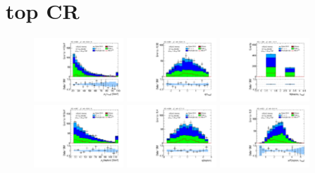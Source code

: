 \clearpage

\section{top CR}

\begin{figure}[!htpb]
  \centering
  \includegraphics[width=0.30\textwidth]{figures/analysis/vbf-topCR/tau-pt}
  \includegraphics[width=0.30\textwidth]{figures/analysis/vbf-topCR/tau-eta}
  \includegraphics[width=0.30\textwidth]{figures/analysis/vbf-topCR/tau-numTrack} \\
  \includegraphics[width=0.30\textwidth]{figures/analysis/vbf-topCR/lep-pt-hi}
  \includegraphics[width=0.30\textwidth]{figures/analysis/vbf-topCR/lep-eta}
  \includegraphics[width=0.30\textwidth]{figures/analysis/vbf-topCR/taulep-dR} \\

\end{figure}
